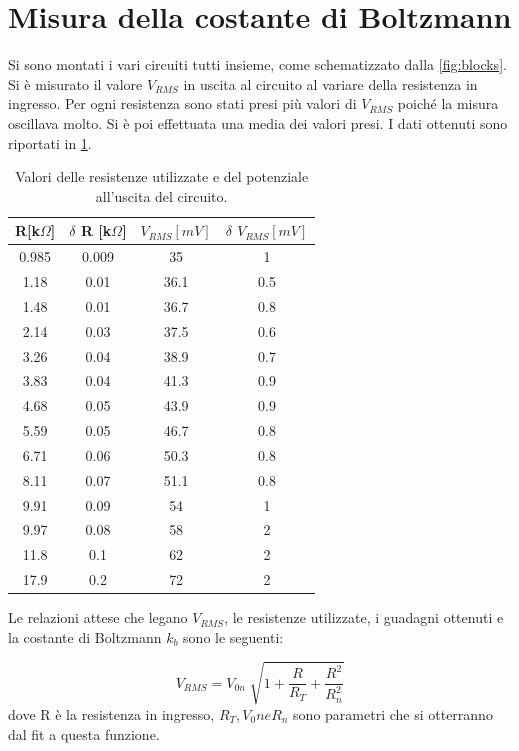 \documentclass[a4paper,10pt]{article}
\begin{document}
\section{Misura della costante di Boltzmann}
Si sono montati i vari circuiti tutti insieme, come schematizzato dalla \cref{fig:blocks}. Si è misurato il valore $V_{RMS}$ in uscita al circuito al variare della resistenza in ingresso. Per ogni resistenza sono stati presi più valori di $V_{RMS}$ poiché la misura oscillava molto. Si è poi effettuata una media dei valori presi. I dati ottenuti sono riportati in \cref{tab:lastfit}.

\begin{table}[H]
	\centering
	\begin{tabular}{cccc}
		\hline
R[k$\Omega$] & $\delta$ R [k$\Omega$] & $V_{RMS}[mV]$  & $\delta$ $V_{RMS}[mV]$ \\
\hline
0.985 & 0.009 & 35 & 1 \\
1.18 & 0.01 & 36.1 & 0.5 \\
1.48 & 0.01 & 36.7 & 0.8 \\
2.14 & 0.03 & 37.5 & 0.6 \\
3.26 & 0.04 & 38.9 & 0.7 \\
3.83 & 0.04 & 41.3 & 0.9 \\
4.68 & 0.05 & 43.9 & 0.9 \\
5.59 & 0.05 & 46.7 & 0.8 \\
6.71 & 0.06 & 50.3 & 0.8 \\
8.11 & 0.07 & 51.1 & 0.8 \\
9.91 & 0.09 & 54 & 1 \\
9.97 & 0.08 & 58 & 2 \\
11.8 & 0.1 & 62 & 2 \\
17.9 & 0.2 & 72 & 2 \\
		\hline
	\end{tabular}
	\caption{Valori delle resistenze utilizzate e del potenziale all'uscita del circuito.}
	\label{tab:lastfit}
\end{table}

Le relazioni attese che legano $V_{RMS}$, le resistenze utilizzate, i guadagni ottenuti e la costante di Boltzmann $k_b$ sono le seguenti:

\begin{equation}
V_{RMS} = V_{0n} \sqrt[]{1+\frac{R}{R_T}+\frac{R^2}{R_n ^2}}
\label{fitt}
\end{equation}
dove R è la resistenza in ingresso, $R_T, V_0n e R_n$ sono parametri che si otterranno dal fit a questa funzione.
\end{document}
